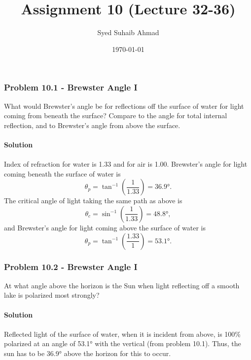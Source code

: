 \documentclass{article}
\title{Assignment \textbf{10} (Lecture 32-36)
}
\author{Syed Suhaib Ahmad}
\date{\today}
\begin{document}
\maketitle


\subsubsection*{Problem 10.1 - Brewster Angle I}
What would Brewster’s angle be for reflections off the surface of water for light coming from beneath the surface? Compare to the angle for total internal reflection, and to Brewster’s angle from above the surface.
\\
\\\textbf{Solution}
\\
\\Index of refraction for water is 1.33 and for air is 1.00. Brewster's angle for light coming beneath the surface of water is
\[\theta_p=\tan^{-1}\left(\frac{1}{1.33}\right)=36.9\text{°}.\]
The critical angle of light taking the same path as above is
\[\theta_c=\sin^{-1}\left(\frac{1}{1.33}\right)=48.8\text{°},\]
and Brewster's angle for light coming above the surface of water is
\[\theta_p=\tan^{-1}\left(\frac{1.33}{1}\right)=53.1\text{°}.\]

\subsubsection*{Problem 10.2 - Brewster Angle I}
At what angle above the horizon is the Sun when light reflecting off a smooth lake is polarized most strongly?
\\
\\\textbf{Solution}
\\
\\Reflected light of the surface of water, when it is incident from above, is 100\% polarized at an angle of 53.1° with the vertical (from problem 10.1). Thus, the sun has to be 36.9° above the horizon for this to occur. 
\end{document}
